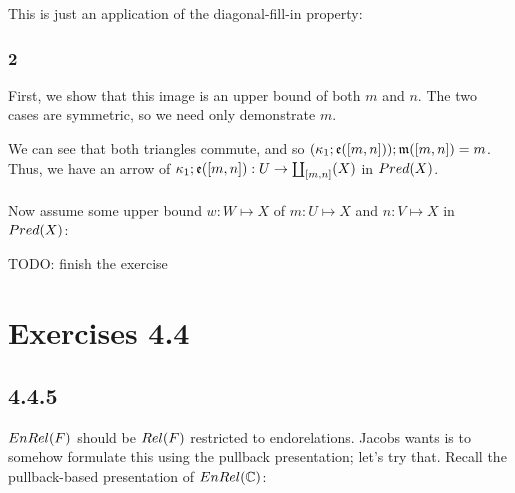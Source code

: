 \documentclass{article}
\begin{document}
This is just an application of the diagonal-fill-in property:

\begin{center}
\end{center}

\subsubsection*{2}

First, we show that this image is an upper bound of both $m$ and $n$. The two cases are symmetric, so we need only 
demonstrate $m$.

\begin{center}
\end{center}

We can see that both triangles commute, and so $(\kappa_1;\frak e([m,n]));\frak m([m,n]) = m$. Thus, we have an arrow
of $\kappa_1;\frak e([m,n]) : U \to \coprod_{[m,n]}(X)$ in $\mit{Pred}(X)$.\\~\\
Now assume some upper bound $w : W \mapsto X$ of $m : U \mapsto X$ and $n : V \mapsto X$ in $\mit{Pred}(X)$:

TODO: finish the exercise

\section*{Exercises 4.4}

\subsection*{4.4.5}

$\mit{EnRel}(F)$ should be $\mit{Rel}(F)$ restricted to endorelations. Jacobs wants is to
somehow formulate this using the pullback presentation; let's try that.
Recall the pullback-based presentation of $\mit{EnRel}(\mathbb C)$:
\end{document}
